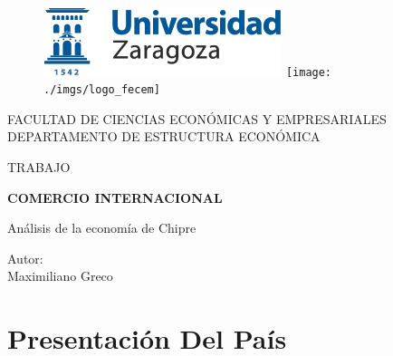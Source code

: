 \documentclass[a4paper,openright,12pt]{book}
\begin{document}
\begin{titlepage}

\begin{center}
\vspace*{-1in}
\begin{figure}[htb]
\begin{center}
\includegraphics[height=2cm]{./imgs/logo_uz}
\hfill
\texttt{[image: ./imgs/logo\_fecem]}
\end{center}
\end{figure}

FACULTAD DE CIENCIAS ECONÓMICAS Y EMPRESARIALES\\
\vspace*{0.15in}
DEPARTAMENTO DE ESTRUCTURA ECONÓMICA\\
\vspace*{0.6in}
\begin{large}
TRABAJO\\
\end{large}
\vspace*{0.2in}
\begin{Large}
\textbf{COMERCIO INTERNACIONAL} \\
\end{Large}
\vspace*{0.3in}
\begin{large}
Análisis de la economía de Chipre\\
\end{large}
\vspace*{0.3in}
\begin{large}
Autor: \\
Maximiliano Greco \\
\end{large}
\end{center}

\end{titlepage}

\newpage


\chapter{Presentación Del País}
\label{cap1}
\end{document}
